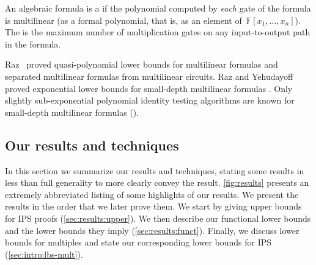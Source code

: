\documentclass{toc}
\begin{document}
\begin{definition}\label{def-ml-fmla}
        An algebraic formula is a  if the polynomial computed by \emph{each} gate of the formula is multilinear (as a formal polynomial, that is, as an element of $\,\mathbb{F}[x_1,\ldots,x_n]$). The  is the maximum number of multiplication gates on any input-to-output path in the formula.
\end{definition}

Raz~\cite{Raz09,Raz06} proved quasi-polynomial lower bounds for multilinear formulas and separated multilinear formulas from multilinear circuits. Raz and Yehudayoff proved exponential lower bounds for small-depth
multilinear formulas \cite{RazYehudayoff09}. Only slightly sub-exponential polynomial identity testing algorithms are known for small-depth multilinear formulas (\cite{OliveiraSV15}).

\subsection{Our results and techniques}\label{sec:results}

In this section we summarize our results and techniques, stating some results in less than full generality to more clearly convey the result. \autoref{fig:results} presents an extremely abbreviated listing of some highlights
of our results.  We present the results in the order that we later prove them. We start by giving upper bounds for IPS proofs (\autoref{sec:results:upper}). We then describe our functional lower bounds and the \lIPS lower bounds they imply (\autoref{sec:results:funct}). Finally, we discuss lower bounds for multiples and state our corresponding lower bounds for IPS (\autoref{sec:intro:lbs-mult}).
\end{document}
